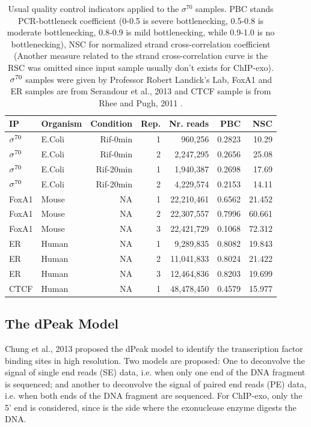 \documentclass[11pt]{article}\usepackage[]{graphicx}\usepackage[]{color}
\begin{document}
\begin{table}[H]
  \centering
  \caption{Usual quality control indicators applied to the $\sigma^{70}$ samples. PBC stands PCR-bottleneck coefficient (0-0.5 is severe bottlenecking, 0.5-0.8 is moderate bottlenecking, 0.8-0.9 is mild bottlenecking, while 0.9-1.0 is no bottlenecking), NSC for normalized strand cross-correlation coefficient (Another measure related to the strand cross-correlation curve is the RSC was omitted since input sample usually don't exists for ChIP-exo). $\sigma^{70}$ samples were given by Professor Robert Landick's Lab, FoxA1 and ER samples are from Serandour et al., 2013 \cite{exoillumina} and CTCF sample is from Rhee and Pugh, 2011 \cite{exo1}. }

\begin{tabular}{l|l|r|r|r|r|r}
\hline\hline
IP & Organism  &Condition & Rep. & Nr. reads & PBC &  NSC  \\
\hline\hline
$\sigma^{70}$ & E.Coli & Rif-0min & 1 & 960,256 & 0.2823 &   10.29 \\
\hline
$\sigma^{70}$ &  E.Coli & Rif-0min & 2 & 2,247,295 & 0.2656 &  25.08  \\
\hline
$\sigma^{70}$ &  E.Coli & Rif-20min & 1 & 1,940,387 & 0.2698 &  17.69  \\
\hline
$\sigma^{70}$ &  E.Coli & Rif-20min & 2 & 4,229,574 & 0.2153 &   14.11 \\
\hline
FoxA1 &  Mouse &  NA & 1 & 22,210,461 & 0.6562 & 21.452 \\
\hline
FoxA1 &  Mouse &  NA & 2 & 22,307,557 & 0.7996 & 60.661 \\
\hline
FoxA1 &  Mouse &  NA & 3 & 22,421,729 & 0.1068 & 72.312 \\
\hline
ER & Human & NA & 1 & 9,289,835 & 0.8082 & 19.843 \\
\hline
ER & Human & NA & 2 & 11,041,833 & 0.8024 & 21.422 \\
\hline
ER & Human & NA & 3 & 12,464,836 & 0.8203 & 19.699 \\
\hline
CTCF & Human & NA & 1 &   48,478,450 & 0.4579 & 15.977 \\
\hline
\end{tabular}  
  \label{tab:qcbase}
\end{table}

\subsection{The dPeak Model}
\label{sec:dpeak}

Chung et al., 2013 proposed the dPeak model to identify the
transcription factor binding sites in high resolution. Two models are
proposed: One to deconvolve the signal of single end reads (SE) data,
i.e. when only one end of the DNA fragment is sequenced; and another
to deconvolve the signal of paired end reads (PE) data, i.e. when both
ends of the DNA fragment are sequenced. For ChIP-exo, only the 5' end
is considered, since is the side where the exonuclease enzyme digests
the DNA.
\end{document}
